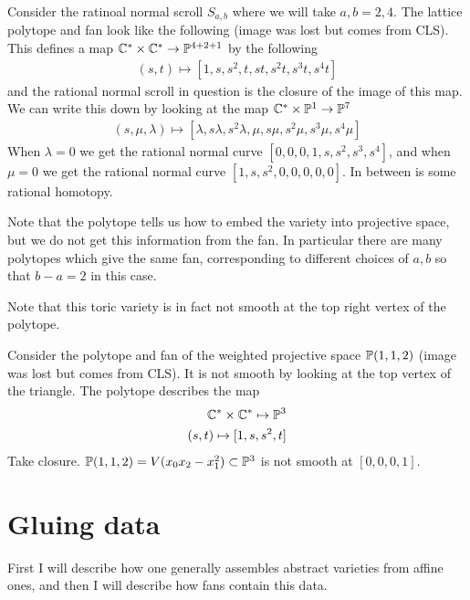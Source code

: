 \documentclass[12pt]{article}
\begin{document}
\begin{example}
	Consider the ratinoal normal scroll $S_{a,b}$ where we will take $a,b = 2,4$.
	The lattice polytope and fan look like the following (image was lost but comes from CLS).
	This defines a map $\C^* \times \C^* \to \P^{4+2+1}$ by the following \begin{align*}
		(s,t)\mapsto [1,s,s^2,t,st,s^2t,s^3t,s^4t]
	\end{align*} and the rational normal scroll in question is the closure of the image of this map. We can write this down
	by looking at the map $\C^*\times \P^1 \to \P^7$ \begin{align*}
		(s,\mu,\lambda)\mapsto [\lambda,s\lambda, s^2\lambda, \mu, s\mu, s^2\mu, s^3\mu, s^4\mu]
	\end{align*} When $\lambda = 0$ we get the rational normal curve $[0,0,0,1,s,s^2,s^3,s^4]$, and when $\mu = 0$
	we get the rational normal curve $[1,s,s^2,0,0,0,0,0]$. In between is some rational homotopy.

	\hfill

	Note that the polytope tells us how to embed the variety into projective space, but we do not get this information
	from the fan. In particular there are many polytopes which give the same fan, corresponding to different choices of
	$a,b$ so that $b-a = 2$ in this case.

	\hfill

	Note that this toric variety is in fact not smooth at the top right vertex of the polytope.
\end{example}

\begin{example}
	Consider the polytope and fan of the weighted projective space $\P(1,1,2)$ (image was lost but comes from CLS).
	It is not smooth by looking at the top vertex of the triangle. The polytope describes the map \begin{align*}
		\C^*\times\C^* \mapsto \P^3 \\
		(s,t) \mapsto [1,s,s^2,t]
	\end{align*}
	Take closure. $\P(1,1,2) = V(x_0x_2 - x_1^2) \subset \P^3$ is not smooth at $[0,0,0,1]$.
\end{example}
\section{Gluing data}
First I will describe how one generally assembles abstract varieties from affine ones,
and then I will describe how fans contain this data.
\end{document}
